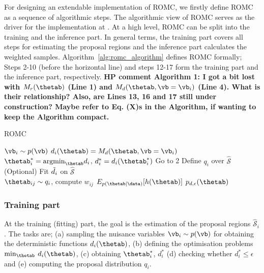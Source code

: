 For designing an extendable implementation of ROMC, we firstly define
ROMC as a sequence of algorithmic steps. The algorithmic view of ROMC
serves as the driver for the implementation at . At a high
level, ROMC can be split into the training and the inference part. In
general terms, the training part covers all steps for estimating the
proposal regions and the inference part calculates the weighted
samples. Algorithm~\ref{alg:romc_algorithm} defines ROMC formally;
Steps 2-10 (before the horizontal line) and steps 12-17 form the training 
part and the inference part, respectively. \textbf{HP comment Algorithm 1: I got a bit 
lost with $M_r(\thetab)$ (Line 1) and $M_d(\thetab, \vb=\vb_i)$ (Line 4). 
What is their relationship? Also, are Lines 13, 16 and 17 still under construction?
Maybe refer to Eq. (X)s in the Algorithm, if wanting to keep the Algorithm compact.}

\begin{algorithm}[!ht]
	\caption{ROMC}\label{alg:romc_algorithm}
	\begin{algorithmic}[1]
      \State $\vb_i \sim p(\vb)$ 
      \State $d_i(\thetab) = M_d(\thetab, \vb=\vb_i)$ 
      \State $\thetab_i^* = \text{argmin}_{\thetab} d_i$, $d_i^*=d_i(\thetab_i^*)$ 
        \State Go to 2 
      \EndIf
      \State Define $q_i$ over $\mathcal{\hat{S}}$ 
      \State (Optional) Fit $\Tilde{d}_i$ on $\mathcal{\hat{S}}$ 
      \\\hrulefill
        \State $\thetab_{ij} \sim q_i$, compute $w_{ij}$ 
      \EndFor
    \EndFor
    \State $E_{p(\thetab|\data)}[h(\thetab)]$ 
    \State $p_{d,\epsilon}(\thetab)$ 
    \EndProcedure
	\end{algorithmic}
\end{algorithm}

\subsubsection*{Training part}
\noindent
At the training (fitting) part, the goal is the estimation of the
proposal regions $\mathcal{\hat{S}}_i$. The tasks are; (a) sampling
the nuisance variables $\vb_i \sim p(\vb)$ for obtaining the
deterministic functions $d_i(\thetab)$, (b) defining the optimisation
problems $\min_{\thetab} \: d_i(\thetab)$, (c) obtaining
$\thetab_i^*$, $d_i^*$ (d) checking whether $d_i^* \leq \epsilon$ and
(e) computing the proposal distribution $q_i$.

